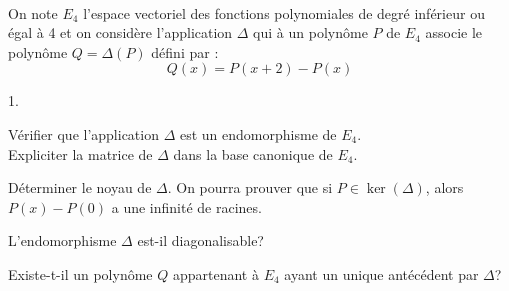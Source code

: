 \documentclass[11pt]{article}%
\begin{document}

\begin{exerciceSP}~\\
  On note $E_4$ l'espace vectoriel des fonctions polynomiales de degré
  inférieur ou égal à 4 et on considère l'application $\Delta$ qui à
  un polynôme $P$ de $E_4$ associe le polynôme $Q = \Delta (P)$ défini
  par :
  \[
  Q(x) = P(x+2) - P(x)
  \]
  \begin{noliste}{1.}
    \setlength{\itemsep}{2mm}
  \item Vérifier que l'application $\Delta$ est un endomorphisme de $E_4$. \\
    Expliciter la matrice de $\Delta$ dans la base canonique de $E_4$.
  \item Déterminer le noyau de $\Delta$. On pourra prouver que si $P
    \in \ker(\Delta)$, alors $P(x) - P(0)$ a une infinité de racines.
  \item L'endomorphisme $\Delta$ est-il diagonalisable?
  \item Existe-t-il un polynôme $Q$ appartenant à $E_4$ ayant un
    unique antécédent par $\Delta$?
  \end{noliste}
\end{exerciceSP}


\newpage


\end{document}
